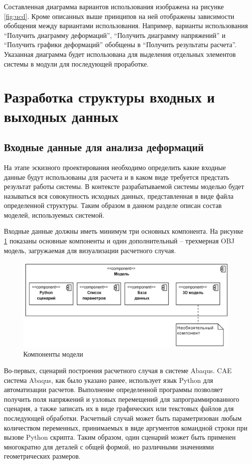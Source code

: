 \documentclass[14pt,oneside,final]{extreport}
\begin{document}
	Составленная диаграмма вариантов использования изображена на рисунке \ref{fig:ucd}. Кроме описанных выше принципов на ней отображены зависимости обобщения между вариантами использования. Например, варианты использования ``Получить диаграмму деформаций'', ``Получить диаграмму напряжений'' и ``Получить графики деформаций'' обобщены в ``Получить результаты расчета''.  Указанная диаграмма будет использована для выделения отдельных элементов системы в модули для последующей проработке. 

	\section{Разработка структуры входных и выходных данных}
	\subsection{Входные данные для анализа деформаций}
	На этапе эскизного проектирования необходимо определить какие входные данные будут использованы для расчета и в каком виде требуется предстать результат работы системы. В контексте разрабатываемой системы моделью будет называться вся совокупность исходных данных, представленная в виде файла определенной структуры. Таким образом в данном разделе описан состав моделей, используемых системой.
	
	Входные данные должны иметь минимум три основных компонента. На рисунке \ref{fig:model-comp-diarg} показаны основные компоненты и один дополнительный -- трехмерная OBJ модель, загружаемая для визуализации расчетного случая. 
		\begin{figure}[!h]
			\begin{center}
				\includegraphics[scale=0.18]{img/model-comp-diarg} 
			\end{center}
			\caption{Компоненты модели}
			\label{fig:model-comp-diarg}
		\end{figure}
	
	Во-первых, сценарий построения расчетного случая в системе Abaqus. CAE система Abaqus, как было указано ранее, использует язык Python для автоматизации расчетов. Выполнение определенной программы позволяет получить поля напряжений и узловых перемещений для запрограммированного сценария, а также записать их в виде графических или текстовых файлов для последующей обработки. Расчетный случай может быть параметризован любым количеством переменных, принимаемых в виде аргументов командной строки при вызове Python скрипта. Таким образом, один сценарий может быть применен многократно для деталей с общей формой, но различными значениями геометрических размеров. 
	
\end{document}
